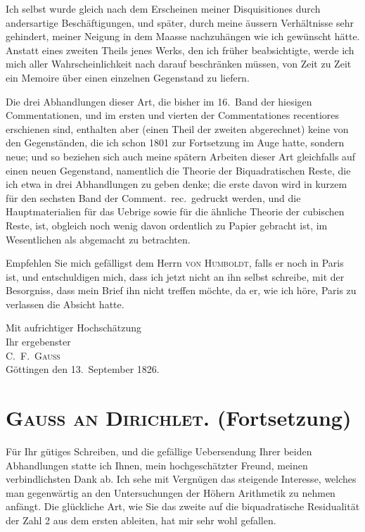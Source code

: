 \documentclass[10pt,a4paper]{article}
\begin{document}
Ich selbst wurde gleich nach dem Erscheinen meiner Disquisitiones durch andersartige Besch\"aftigungen, und sp\"ater, durch meine \"aussern Verh\"altnisse sehr gehindert, meiner Neigung in dem Maasse nachzuh\"angen wie ich gew\"unscht h\"atte. Anstatt eines zweiten Theils jenes Werks, den ich fr\"uher beabsichtigte, werde ich mich aller Wahrscheinlichkeit nach darauf beschr\"anken m\"ussen, von Zeit zu Zeit ein Memoire \"uber einen einzelnen Gegenstand zu liefern.

Die drei Abhandlungen dieser Art, die bisher im 16.~Band der hiesigen Commentationen, und im ersten und vierten der Commentationes recentiores erschienen sind, enthalten aber (einen Theil der zweiten abgerechnet) keine von den Gegenst\"anden, die ich schon 1801 zur Fortsetzung im Auge hatte, sondern neue; und so beziehen sich auch meine sp\"atern Arbeiten dieser Art gleichfalls auf einen neuen Gegenstand, namentlich die Theorie der Biquadratischen Reste, die ich etwa in drei Abhandlungen zu geben denke; die erste davon wird in kurzem f\"ur den sechsten Band der Comment.~rec.~gedruckt werden, und die Hauptmaterialien f\"ur das Uebrige sowie f\"ur die \"ahnliche Theorie der cubischen Reste, ist, obgleich noch wenig davon ordentlich zu Papier gebracht ist, im Wesentlichen als abgemacht zu betrachten.

Empfehlen Sie mich gef\"alligst dem Herrn \textsc{von Humboldt}, falls er noch in Paris ist, und entschuldigen mich, dass ich jetzt nicht an ihn selbst schreibe, mit der Besorgniss, dass mein Brief ihn nicht treffen m\"ochte, da er, wie ich h\"ore, Paris zu verlassen die Absicht hatte.

\begin{flushright}
Mit aufrichtiger Hochsch\"atzung\\[1ex]
Ihr ergebenster\\[1ex]
\textsc{C.\ F.\ Gau\ss{}}\\[1ex]
G\"ottingen den 13.~September 1826.
\end{flushright}

\newpage

\section*{\centering\textsc{Gau\ss{} an Dirichlet.} (Fortsetzung)}

F\"ur Ihr g\"utiges Schreiben, und die gef\"allige Uebersendung Ihrer beiden Abhandlungen statte ich Ihnen, mein hochgesch\"atzter Freund, meinen verbindlichsten Dank ab. Ich sehe mit Vergn\"ugen das steigende Interesse, welches man gegenw\"artig an den Untersuchungen der H\"ohern Arithmetik zu nehmen anf\"angt. Die gl\"uckliche Art, wie Sie das zweite auf die biquadratische Residualit\"at der Zahl 2 aus dem ersten ableiten, hat mir sehr wohl gefallen.
\end{document}
